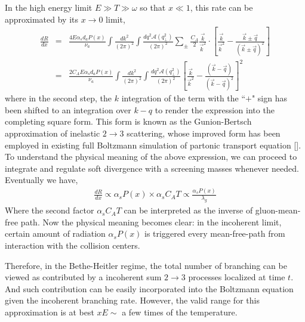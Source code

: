In the high energy limit $E\gg T \gg \omega$ so that $x\ll 1$, this rate can be approximated by its $x\rightarrow 0$ limit, 
\begin{eqnarray}
\frac{dR}{dx} &=& \frac{4 E\alpha_s d_a P(x)}{\nu_a} \int \frac{dk^2}{(2\pi)^2} \int \frac{dq^2 \mathcal{A}(q_\perp^2)}{(2\pi)^2}  \sum_{\pm}
\frac{C_A}{2} \frac{\vec{k}}{\vec{k}^2}\cdot\left[\frac{\vec{k}}{\vec{k}^2}-\frac{\vec{k}\pm\vec{q}}{(\vec{k}\pm\vec{q})^2}\right] \\
&=& \frac{2 C_A E\alpha_s d_a P(x)}{\nu_a} \int \frac{dk^2}{(2\pi)^2} \int \frac{dq^2 \mathcal{A}(q_\perp^2)}{(2\pi)^2} 
\left[\frac{\vec{k}}{\vec{k}^2}-\frac{(\vec{k}-\vec{q})}{(\vec{k}-\vec{q})^2}\right]^2
\end{eqnarray}
where in the second step, the $k$ integration of the term with the ``$+$" sign has been shifted to an integration over $k-q$ to render the expression into the completing square form.
This form is known as the Gunion-Bertsch approximation of inelastic $2\rightarrow 3$ scattering, whose improved form has been employed in existing full Boltzmann simulation of partonic transport equation [].
To understand the physical meaning of the above expression, we can proceed to integrate and regulate soft divergence with a screening masses whenever needed.
Eventually we have,
\begin{eqnarray}
\frac{dR}{dx} \propto \alpha_s P(x) \times \alpha_s C_A T \propto \frac{\alpha_s P(x)}{\lambda_g}
\end{eqnarray}
Where the second factor $\alpha_s C_A T$ can be interpreted as the inverse of gluon-mean-free path. 
Now the physical meaning becomes clear: in the incoherent limit, certain amount of radiation $\alpha_s P(x)$ is triggered every mean-free-path from interaction with the collision centers.

Therefore, in the Bethe-Heitler regime, the total number of branching can be viewed as contributed by a incoherent sum $2\rightarrow 3$ processes localized at time $t$.
And such contribution can be easily incorporated into the Boltzmann equation given the incoherent branching rate.
However, the valid range for this approximation is at best $x E \sim$ a few times of the temperature.


